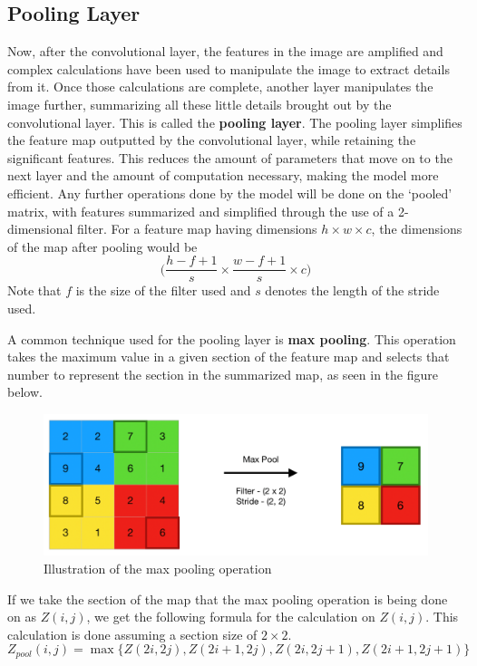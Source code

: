     \subsection{Pooling Layer}
        \large Now, after the convolutional layer, the features in the image are amplified and complex calculations have been used to manipulate the image to extract details from it. Once those calculations are complete, another layer manipulates the image further, summarizing all these little details brought out by the convolutional layer. This is called the \textbf{pooling layer}. The pooling layer simplifies the feature map outputted by the convolutional layer, while retaining the significant features. This reduces the amount of parameters that move on to the next layer and the amount of computation necessary, making the model more efficient. Any further operations done by the model will be done on the `pooled' matrix, with features summarized and simplified through the use of a 2-dimensional filter. For a feature map having dimensions $h \times w \times c$, the dimensions of the map after pooling would be 
        $$\biggl( \frac{h - f + 1}{s} \times \frac{w - f + 1}{s} \times c \biggr)$$
        Note that $f$ is the size of the filter used and $s$ denotes the length of the stride used. \newline

        A common technique used for the pooling layer is \textbf{max pooling}. This operation takes the maximum value in a given section of the feature map and selects that number to represent the section in the summarized map, as seen in the figure below. 

        \begin{figure}[H]
            \centering
            \includegraphics[width=0.75\linewidth]{cv/maxpooling.png}
            \caption{Illustration of the max pooling operation}
            \label{fig:maxpooling}
        \end{figure}

        If we take the section of the map that the max pooling operation is being done on as $Z(i, j)$, we get the following formula for the calculation on $Z(i, j)$. This calculation is done assuming a section size of $2 \times 2$.
        $$Z_{pool}(i, j) = \max \{Z(2i,2j), Z(2i+1,2j), Z(2i,2j+1), Z(2i+1,2j+1)\}$$ 

